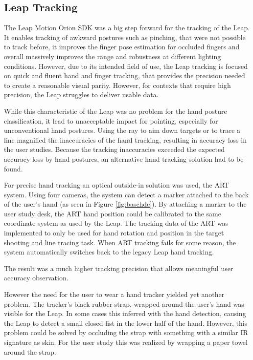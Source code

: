 \subsection{Leap Tracking}

The Leap Motion Orion SDK was a big step forward for the tracking of the Leap. It enables tracking of awkward postures such as pinching, that were not possible to track before, it improves the finger pose estimation for occluded fingers and overall massively improves the range and robustness at different lighting conditions. However, due to its intended field of use, the Leap tracking is focused on quick and fluent hand and finger tracking, that provides the precision needed to create a reasonable visual parity. However, for contexts that require high precision, the Leap struggles to deliver usable data. 

While this characteristic of the Leap was no problem for the hand posture classification, it lead to unacceptable impact for pointing, especially for unconventional hand postures. Using the ray to aim down targets or to trace a line magnified the inaccuracies of the hand tracking, resulting in accuracy loss in the user studies. Because the tracking inaccuracies exceeded the expected accuracy loss by hand postures, an alternative hand tracking solution had to be found.

For precise hand tracking an optical outside-in solution was used, the ART system. Using four cameras, the system can detect a marker attached to the back of the user's hand (as seen in Figure \ref{fig:baschde}). By attaching a marker to the user study desk, the ART hand position could be calibrated to the same coordinate system as used by the Leap. The tracking data of the ART was implemented to only be used for hand rotation and position in the target shooting and line tracing task. When ART tracking fails for some reason, the system automatically switches back to the legacy Leap hand tracking.  

The result was a much higher tracking precision that allows meaningful user accuracy observation.  

However the need for the user to wear a hand tracker yielded yet another problem. The tracker's black rubber strap, wrapped around the user's hand was visible for the Leap. In some cases this inferred with the hand detection, causing the Leap to detect a small closed fist in the lower half of the hand. However, this problem could be solved by occluding the strap with something with a similar IR signature as skin. For the user study this was realized by wrapping a paper towel around the strap. 

